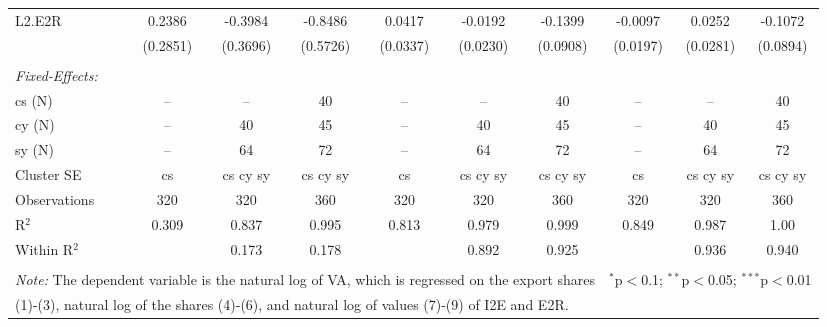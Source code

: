 \documentclass[a4paper]{article}
\begin{document}
\begin{table}[h!]
{\begin{tabular}[t]{lccccccccc}
L2.E2R&0.2386 & -0.3984 & -0.8486 & 0.0417 & -0.0192 & -0.1399 & -0.0097 & 0.0252 & -0.1072\\
  &(0.2851) & (0.3696) & (0.5726) & (0.0337) & (0.0230) & (0.0908) & (0.0197) & (0.0281) & (0.0894)\\\\
\midrule \emph{Fixed-Effects:} &   &   &   &   &   &  \\
cs (N) & -- & -- & 40 & -- & -- & 40 & -- & -- & 40\\
cy (N) & -- & 40 & 45 & -- & 40 & 45 & -- & 40 & 45\\
sy (N) & -- & 64 & 72 & -- & 64 & 72 & -- & 64 & 72\\
\midrule
Cluster SE & cs & cs cy sy & cs cy sy & cs & cs cy sy & cs cy sy & cs & cs cy sy & cs cy sy\\
Observations & 320&320&360&320&320&360&320&320&360\\
R$^2$ & 0.309&0.837&0.995&0.813&0.979&0.999&0.849&0.987&1.00\\
Within R$^2$ & &0.173&0.178&&0.892&0.925&&0.936&0.940\\ \bottomrule \\[-1em]
\multicolumn{7}{l}{\small \textit{Note:} The dependent variable is the natural log of VA, which is regressed on the  export shares}   & \multicolumn{3}{r}{$^{*}$p$<$0.1; $^{**}$p$<$0.05; $^{***}$p$<$0.01} \\ [-0.2em]
\multicolumn{10}{l}{\small \quad \quad \quad (1)-(3), natural log of the shares (4)-(6), and natural log of values (7)-(9) of I2E and E2R.} \\
\end{tabular}
}
\end{table}
\FloatBarrier
\end{document}
